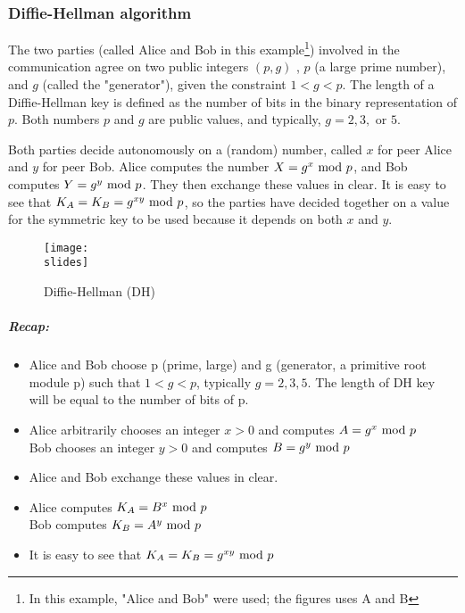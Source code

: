 \subsubsection{Diffie-Hellman algorithm}
The two parties (called Alice and Bob in this example\footnote{In this example, "Alice and Bob" were used; the figures uses A and B}) involved in the communication agree on two public integers $(p,g)$ , $p$ (a large prime number), and $g$ (called the "generator"), given the constraint $1 < g < p$.
The length of a Diffie-Hellman key is defined as the number of bits in the binary representation of \(p\). Both numbers $p$ and $g$ are public values, and typically, $g = 2, 3, \text{ or } 5$.

Both parties decide autonomously on a (random) number, called $x$ for peer Alice and $y$ for peer Bob. Alice computes the number $ X = g^x \text{ mod } p $, and Bob computes $Y = g^y \text{ mod } p$. They then exchange these values in clear.
It is easy to see that $K_A = K_B = g^{xy}\text{ mod } p$, so the parties have decided together on a value for the symmetric key to be used because it depends on both $x$ and $y$.


\begin{figure}[h]
    \centering
    \texttt{[image: \\slides]}
    \caption{Diffie-Hellman (DH)}
    \label{fig:diffie-hellman}
\end{figure}

\subparagraph*{Recap:}
\begin{itemize}
    \item Alice and Bob choose p (prime, large) and g (generator, a primitive root module p) such that $1 < g < p$, typically $g = 2,3,5$. The length of DH key will be equal to the number of bits of p.
    \item Alice arbitrarily chooses an integer $x >0$ and computes $ A = g^x \text{ mod } p $\\
          Bob chooses an integer $y >0$ and computes $ B = g^y\text{ mod } p $
    \item Alice and Bob exchange these values in clear.
    \item Alice computes $K_A = B^x\text{ mod } p$\\
          Bob computes $K_B = A^y\text{ mod } p$
    \item It is easy to see that $K_A = K_B = g^{xy} \text{ mod } p$
\end{itemize}

